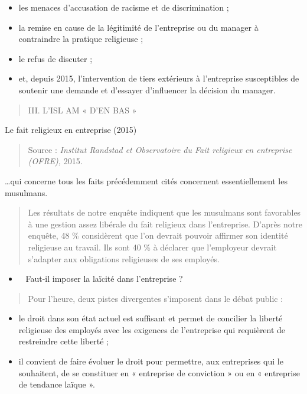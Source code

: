 \begin{itemize}
\item
  les menaces d'accusation de racisme et de discrimination ;
\item
  la remise en cause de la légitimité de l'entreprise ou du manager à
  contraindre la pratique religieuse ;
\item
  le refus de discuter ;
\item
  et, depuis 2015, l'intervention de tiers extérieurs à l'entreprise
  susceptibles de soutenir une demande et d'essayer d'influencer la
  décision du manager.
\end{itemize}

\begin{quote}
III. L'ISL AM « D'EN BAS »
\end{quote}

Le fait religieux en entreprise (2015)

\begin{quote}
Source : \emph{Institut Randstad et Observatoire du Fait religieux en
entreprise (OFRE),} 2015.
\end{quote}

\ldots qui concerne tous les faits précédemment cités concernent
essentiellement les musulmans.

\begin{quote}
Les résultats de notre enquête indiquent que les musulmans sont
favorables à une gestion assez libérale du fait religieux dans
l'entreprise. D'après notre enquête, 48 \% considèrent que l'on devrait
pouvoir affirmer son identité religieuse au travail. Ils sont 40 \% à
déclarer que l'employeur devrait s'adapter aux obligations religieuses
de ses employés.
\end{quote}

\begin{itemize}
\item ~
  Faut-il imposer la laïcité dans l'entreprise ?
\end{itemize}

\begin{quote}
Pour l'heure, deux pistes divergentes s'imposent dans le débat public :
\end{quote}

\begin{itemize}
\item
  le droit dans son état actuel est suffisant et permet de concilier la
  liberté religieuse des employés avec les exigences de l'entreprise qui
  requièrent de restreindre cette liberté ;
\item
  il convient de faire évoluer le droit pour permettre, aux entreprises
  qui le souhaitent, de se constituer en « entreprise de conviction » ou
  en « entreprise de tendance laïque ».
\end{itemize}

